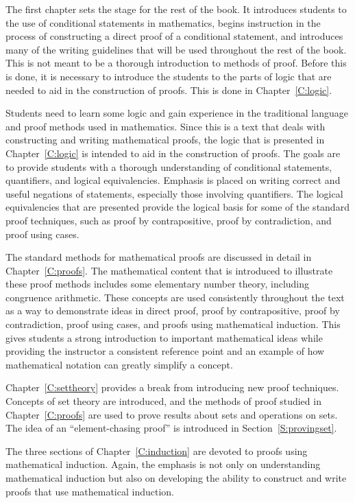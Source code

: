 The first chapter sets the stage for the rest of the book.  It introduces students to the use of conditional statements in mathematics, begins instruction in the process of constructing a direct proof of a conditional statement, and introduces many of the writing guidelines that will be used throughout the rest of the book.  This is not meant to be a thorough introduction to methods of proof.  Before this is done, it is necessary to introduce the students to the parts of logic that are needed to aid in the construction of proofs.  This is done in 
Chapter~\ref{C:logic}.  

Students need to learn some logic and gain experience in the traditional language and proof methods used in mathematics. Since this is a text that deals with constructing and writing mathematical proofs, the logic that is presented in Chapter~\ref{C:logic} is intended to aid in the construction of proofs.  The goals are to provide students with a thorough understanding of conditional statements, quantifiers, and logical equivalencies.  Emphasis is placed on writing correct and useful negations of statements, especially those involving quantifiers.  The logical equivalencies that are presented provide the logical basis for some of the standard proof techniques, such as proof by contrapositive, proof by contradiction, and proof using cases.

The standard methods for mathematical proofs are discussed in detail in Chapter~\ref{C:proofs}.  The mathematical content that is introduced to illustrate these proof methods includes some elementary number theory, including congruence arithmetic.  These concepts are used consistently throughout the text as a way to demonstrate ideas in direct proof, proof by contrapositive, proof by contradiction, proof using cases, and proofs using mathematical induction.  This gives students a strong introduction to important mathematical ideas while providing the instructor a consistent reference point and an example of how mathematical notation can greatly simplify a concept.

Chapter~\ref{C:settheory} provides a break from introducing new proof techniques.  Concepts of set theory are introduced, and the methods of proof studied in Chapter~\ref{C:proofs} are used to prove results about sets and operations on sets.  The idea of an ``element-chasing proof'' is introduced in Section~\ref{S:provingset}.

The three sections of Chapter~\ref{C:induction} are devoted to proofs using mathematical induction.  Again, the emphasis is not only on understanding mathematical induction but also on developing the ability to construct and write proofs that use mathematical induction.

